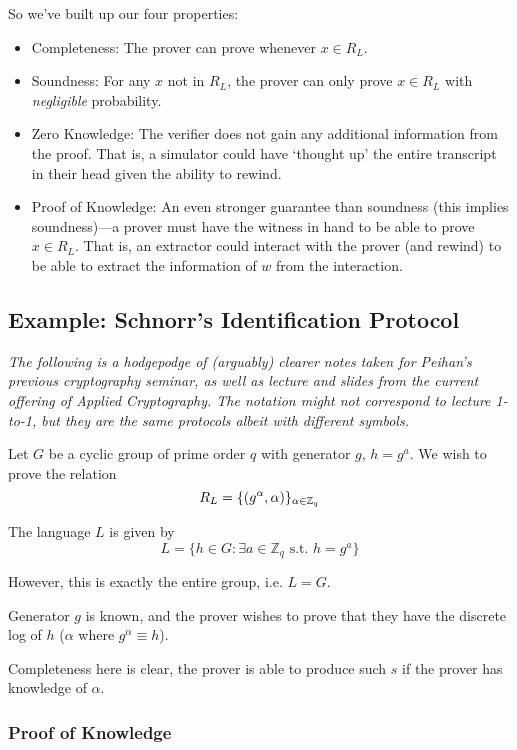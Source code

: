 So we've built up our four properties:
\begin{itemize}
    \item Completeness: The prover can prove whenever $x\in R_L$.
    \item Soundness: For any $x$ not in $R_L$, the prover can only prove $x\in R_L$ with \emph{negligible} probability.
    \item Zero Knowledge: The verifier does not gain any additional information from the proof. That is, a simulator could have `thought up' the entire transcript in their head given the ability to rewind.
    \item Proof of Knowledge: An even stronger guarantee than soundness (this implies soundness)---a prover must have the witness in hand to be able to prove $x\in R_L$. That is, an extractor could interact with the prover (and rewind) to be able to extract the information of $w$ from the interaction.
\end{itemize}

\subsection{Example: Schnorr's Identification Protocol}\label{sec:mar7-schnorr}
\begin{remark*}
    \emph{The following is a hodgepodge of (arguably) clearer notes taken for Peihan's previous cryptography seminar, as well as lecture and slides from the current offering of Applied Cryptography. The notation might not correspond to lecture 1-to-1, but they are the same protocols albeit with different symbols.}
\end{remark*}
Let $G$ be a cyclic group of prime order $q$ with generator $g$, $h = g^a$. We wish to prove the relation
\[R_L = \{(g^\alpha, \alpha)\}_{\alpha\in \mathbb Z_q}\]

The language $L$ is given by
\[L = \{ h\in G: \exists a \in \mathbb{Z}_q \text{ s.t. }h = g^a\}\]

However, this is exactly the entire group, i.e. $L = G$. 

Generator $g$ is known, and the prover wishes to prove that they have the discrete log of $h$ ($\alpha$ where $g^\alpha\equiv h$).


Completeness here is clear, the prover is able to produce such $s$ if the prover has knowledge of $\alpha$.

\subsubsection{Proof of Knowledge}

